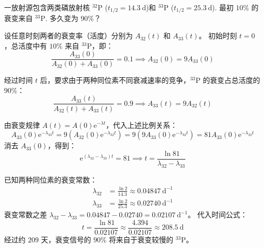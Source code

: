 \begin{exercise}\label{ex:29.18}
一放射源包含两类磷放射核 $^{32}\mathrm{P}$ ($t_{1/2} = 14.3 \ \mathrm{d}$)和 $^{33}\mathrm{P}$ ($t_{1/2} = 25.3 \ \mathrm{d}$). 最初 $10\%$ 的衰变来自 $^{33}\mathrm{P}$. 多久变为 $90\%$？
\end{exercise}
\begin{solution}
设任意时刻两者的衰变率（活度）分别为 $A_{32}(t)$ 和 $A_{33}(t)$。
初始时刻 $t=0$，总活度中有 $10\%$ 来自 $^{33}\mathrm{P}$，即：
$$ \frac{A_{33}(0)}{A_{32}(0) + A_{33}(0)} = 0.1 \implies A_{32}(0) = 9 A_{33}(0) $$

经过时间 $t$ 后，要求由于两种同位素不同衰减速率的竞争，$^{33}\mathrm{P}$ 的衰变占总活度的 $90\%$：
$$ \frac{A_{33}(t)}{A_{32}(t) + A_{33}(t)} = 0.9 \implies A_{33}(t) = 9 A_{32}(t) $$

由衰变规律 $A(t) = A(0) \mathrm{e}^{-\lambda t}$，代入上述比例关系：
$$ A_{33}(0) \mathrm{e}^{-\lambda_{33} t} = 9 \left( A_{32}(0) \mathrm{e}^{-\lambda_{32} t} \right) = 9 \left( 9 A_{33}(0) \mathrm{e}^{-\lambda_{32} t} \right) = 81 A_{33}(0) \mathrm{e}^{-\lambda_{32} t} $$
消去 $A_{33}(0)$，得到：
$$ \mathrm{e}^{(\lambda_{32} - \lambda_{33}) t} = 81 \implies t = \frac{\ln 81}{\lambda_{32} - \lambda_{33}} $$

已知两种同位素的衰变常数：
\begin{align*}
    \lambda_{32} &= \frac{\ln 2}{14.3} \approx 0.04847 \ \mathrm{d^{-1}} \\
    \lambda_{33} &= \frac{\ln 2}{25.3} \approx 0.02740 \ \mathrm{d^{-1}}
\end{align*}
衰变常数之差 $\lambda_{32} - \lambda_{33} = 0.04847 - 0.02740 = 0.02107 \ \mathrm{d^{-1}}$。
代入时间公式：
$$ t = \frac{\ln 81}{0.02107} \approx \frac{4.394}{0.02107} \approx 208.5 \ \mathrm{d} $$
经过约 $209$ 天，衰变信号的 $90\%$ 将来自于衰变较慢的 $^{33}\mathrm{P}$。
\end{solution}

